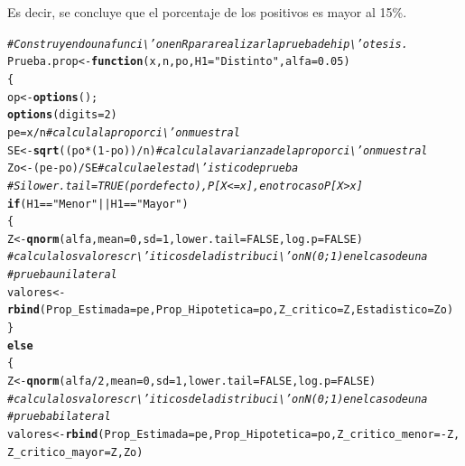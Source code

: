 \documentclass[12pt,letterpaper]{article}\usepackage[]{graphicx}\usepackage[]{color}
\makeatletter
\newcommand{\hlnum}[1]{\textcolor[rgb]{0.686,0.059,0.569}{#1}}%
\newcommand{\hlstr}[1]{\textcolor[rgb]{0.192,0.494,0.8}{#1}}%
\newcommand{\hlcom}[1]{\textcolor[rgb]{0.678,0.584,0.686}{\textit{#1}}}%
\newcommand{\hlopt}[1]{\textcolor[rgb]{0,0,0}{#1}}%
\newcommand{\hlstd}[1]{\textcolor[rgb]{0.345,0.345,0.345}{#1}}%
\newcommand{\hlkwa}[1]{\textcolor[rgb]{0.161,0.373,0.58}{\textbf{#1}}}%
\newcommand{\hlkwb}[1]{\textcolor[rgb]{0.69,0.353,0.396}{#1}}%
\newcommand{\hlkwc}[1]{\textcolor[rgb]{0.333,0.667,0.333}{#1}}%
\newcommand{\hlkwd}[1]{\textcolor[rgb]{0.737,0.353,0.396}{\textbf{#1}}}%
\newenvironment{kframe}{%
 \def\at@end@of@kframe{}%
 \ifinner\ifhmode%
  \def\at@end@of@kframe{\end{minipage}}%
  \begin{minipage}{\columnwidth}%
 \fi\fi%
 \def\FrameCommand##1{\hskip\@totalleftmargin \hskip-\fboxsep
 \colorbox{shadecolor}{##1}\hskip-\fboxsep
     \hskip-\linewidth \hskip-\@totalleftmargin \hskip\columnwidth}%
 \MakeFramed {\advance\hsize-\width
   \@totalleftmargin\z@ \linewidth\hsize
   \@setminipage}}%
 {\par\unskip\endMakeFramed%
 \at@end@of@kframe}
\newenvironment{knitrout}{}{} %
\makeatother
\begin{document}
Es decir, se concluye que el porcentaje de los positivos es mayor al 15\%.\\
\begin{knitrout}
\color{fgcolor}\begin{kframe}
\begin{alltt}
\hlcom{# Construyendo una funci\textbackslash{}'on en R para realizar la prueba de hip\textbackslash{}'otesis. }
\hlstd{Prueba.prop} \hlkwb{<-} \hlkwa{function}\hlstd{(}\hlkwc{x}\hlstd{,} \hlkwc{n}\hlstd{,} \hlkwc{po}\hlstd{,} \hlkwc{H1}\hlstd{=}\hlstr{"Distinto"}\hlstd{,} \hlkwc{alfa}\hlstd{=}\hlnum{0.05}\hlstd{)}
\hlstd{\{}
\hlstd{op} \hlkwb{<-} \hlkwd{options}\hlstd{();}
\hlkwd{options}\hlstd{(}\hlkwc{digits}\hlstd{=}\hlnum{2}\hlstd{)}
\hlstd{pe}\hlkwb{=}\hlstd{x}\hlopt{/}\hlstd{n} \hlcom{#calcula la proporci\textbackslash{}'on muestral }
\hlstd{SE} \hlkwb{<-} \hlkwd{sqrt}\hlstd{((po} \hlopt{*} \hlstd{(}\hlnum{1}\hlopt{-}\hlstd{po))}\hlopt{/}\hlstd{n)} \hlcom{# calcula la varianza de la proporci\textbackslash{}'on muestral }
\hlstd{Zo} \hlkwb{<-} \hlstd{(pe}\hlopt{-}\hlstd{po)}\hlopt{/}\hlstd{SE} \hlcom{#calcula el estad\textbackslash{}'istico de prueba }
\hlcom{# Si lower.tail = TRUE (por defecto), P[X <= x], en otro caso P[X > x] }
\hlkwa{if} \hlstd{(H1} \hlopt{==} \hlstr{"Menor"} \hlopt{||} \hlstd{H1} \hlopt{==} \hlstr{"Mayor"}\hlstd{)}
\hlstd{\{}
\hlstd{Z} \hlkwb{<-} \hlkwd{qnorm}\hlstd{(alfa,} \hlkwc{mean}\hlstd{=}\hlnum{0}\hlstd{,} \hlkwc{sd}\hlstd{=}\hlnum{1}\hlstd{,} \hlkwc{lower.tail} \hlstd{=} \hlnum{FALSE}\hlstd{,} \hlkwc{log.p} \hlstd{=} \hlnum{FALSE}\hlstd{)}
\hlcom{# calcula los valores cr\textbackslash{}'iticos de la distribuci\textbackslash{}'on N(0;1) en el caso de una }
\hlcom{# prueba unilateral }
\hlstd{valores} \hlkwb{<-} \hlkwd{rbind}\hlstd{(}\hlkwc{Prop_Estimada}\hlstd{=pe,} \hlkwc{Prop_Hipotetica}\hlstd{=po,} \hlkwc{Z_critico}\hlstd{=Z,}\hlkwc{Estadistico}\hlstd{= Zo)}
\hlstd{\}}
\hlkwa{else}
\hlstd{\{}
\hlstd{Z} \hlkwb{<-} \hlkwd{qnorm}\hlstd{(alfa}\hlopt{/}\hlnum{2}\hlstd{,} \hlkwc{mean}\hlstd{=}\hlnum{0}\hlstd{,} \hlkwc{sd}\hlstd{=}\hlnum{1}\hlstd{,} \hlkwc{lower.tail} \hlstd{=} \hlnum{FALSE}\hlstd{,} \hlkwc{log.p} \hlstd{=} \hlnum{FALSE}\hlstd{)}
\hlcom{# calcula los valores cr\textbackslash{}'iticos de la distribuci\textbackslash{}'on N(0;1) en el caso de una }
\hlcom{# prueba  bilateral }
\hlstd{valores} \hlkwb{<-} \hlkwd{rbind}\hlstd{(}\hlkwc{Prop_Estimada}\hlstd{=pe,} \hlkwc{Prop_Hipotetica} \hlstd{=po,} \hlkwc{Z_critico_menor}\hlstd{=}\hlopt{-}\hlstd{Z,}
\hlkwc{Z_critico_mayor} \hlstd{=Z, Zo)}

\end{alltt}
\end{kframe}
\end{knitrout}
\end{document}
